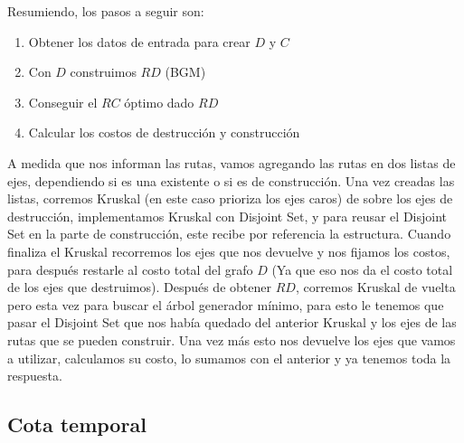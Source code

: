 Resumiendo, los pasos a seguir son:

\begin{enumerate}
	\item Obtener los datos de entrada para crear $D$ y $C$

	\item Con $D$ construimos $RD$ (BGM) 

	\item Conseguir el $RC$ óptimo dado $RD$

	\item Calcular los costos de destrucción y construcción
\end{enumerate}

A medida que nos informan las rutas, vamos agregando las rutas en dos listas de ejes, dependiendo si es una existente o si es de construcción. Una vez creadas las listas, corremos Kruskal (en este caso prioriza los ejes caros) de sobre los ejes de destrucción, implementamos Kruskal con Disjoint Set, y para reusar el Disjoint Set en la parte de construcción, este recibe por referencia la estructura. Cuando finaliza el Kruskal recorremos los ejes que nos devuelve y nos fijamos los costos, para después restarle al costo total del grafo $D$ (Ya que eso nos da el costo total de los ejes que destruimos). Después de obtener $RD$, corremos Kruskal de vuelta pero esta vez para buscar el árbol generador mínimo, para esto le tenemos que pasar el Disjoint Set que nos había quedado del anterior Kruskal  y los ejes de las rutas que se pueden construir. Una vez más esto nos devuelve los ejes que vamos a utilizar, calculamos su costo, lo sumamos con el anterior y ya tenemos toda la respuesta.

\subsection{Cota temporal}

